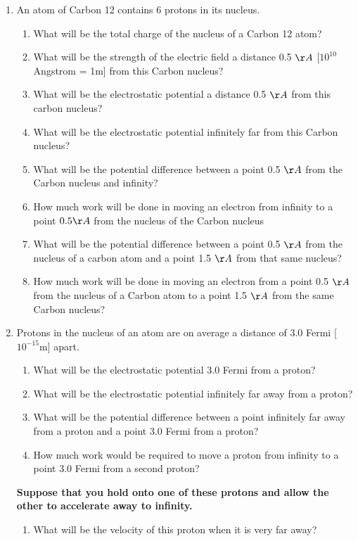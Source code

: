 \documentclass[12pt]{article}
\begin{document}
\begin{enumerate}
\item An atom of Carbon 12 contains 6 protons in its nucleus.
\begin{enumerate}
  \item What will be the total charge of the nucleus of a Carbon 12 atom?
  \item What will be the strength of the electric field a distance 0.5 $\AA$ [$10^{10}$ Angstrom = 1m] from this
    Carbon nucleus?
  \item What will be the electrostatic potential a distance 0.5 $\AA$ from this carbon nucleus?
  \item What will be the electrostatic potential infinitely far from this Carbon nucleus?
  \item What will be the potential difference between a point 0.5 $\AA$ from the Carbon nucleus and infinity?
  \item How much work will be done in moving an electron from infinity to a point $0.5 \AA$ from the nucleus of the Carbon nucleus
  \item What will be the potential difference between a point 0.5 $\AA$ from the nucleus of a carbon atom and a point 1.5 $\AA$ from that same nucleus?
  \item How much work will be done in moving an electron from a point 0.5 $\AA$ from the nucleus of a Carbon atom to a point 1.5 $\AA$ from the same Carbon nucleus?
\end{enumerate}

\item Protons in the nucleus of an atom are on average a distance of 3.0 Fermi [$10^{-15}$m] apart.
\begin{enumerate}
  \item What will be the electrostatic potential 3.0 Fermi from a proton?
  \item What will be the electrostatic potential infinitely far away from a proton?
  \item What will be the potential difference between a point infinitely far away from a proton and a point 3.0 Fermi from a proton?
  \item How much work would be required to move a proton from infinity to a point 3.0 Fermi from a second proton?
\end{enumerate}

\textbf{Suppose that you hold onto one of these protons and allow the other to accelerate away to infinity.}

\begin{enumerate}[resume]
  \item What will be the velocity of this proton when it is very far away?
\end{enumerate}

\end{enumerate}
\end{document}
